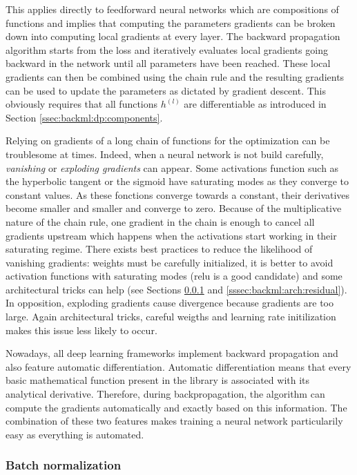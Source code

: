 This applies directly to feedforward neural networks which are compositions of
functions and implies that computing the parameters gradients can be broken down
into computing local gradients at every layer. The backward propagation algorithm
starts from the loss and iteratively evaluates local gradients going backward in
the network until all parameters have been reached. These local gradients can then
be combined using the chain rule and the resulting gradients can be used to update
the parameters as dictated by gradient descent. This obviously requires that all
functions $h^{(l)}$ are differentiable as introduced in Section
\ref{ssec:backml:dp:components}.

Relying on gradients of a long chain of functions for the optimization can be
troublesome at times. Indeed, when a neural network is not build carefully,
\textit{vanishing} or \textit{exploding gradients} can appear. Some activations
function such as the hyperbolic tangent or the sigmoid have saturating modes as
they converge to constant values. As these fonctions converge towards a constant,
their derivatives become smaller and smaller and converge to zero. Because of the
multiplicative nature of the chain rule, one gradient in the chain is enough to
cancel all gradients upstream which happens when the activations start working in
their saturating regime. There exists best practices to reduce the likelihood of
vanishing gradients: weights must be carefully initialized, it is better to avoid
activation functions with saturating modes (\acrshort{relu} is a good candidate)
and some architectural tricks can help (see Sections \ref{sssec:backml:batchnorm}
and \ref{sssec:backml:arch:residual}). In opposition, exploding gradients cause
divergence because gradients are too large. Again architectural tricks, careful
weigths and learning rate initilization makes this issue less likely to occur.

Nowadays, all deep learning frameworks implement backward propagation and also
feature automatic differentiation. Automatic differentiation means that every
basic mathematical function present in the library is associated with its analytical
derivative. Therefore, during backpropagation, the algorithm can compute the
gradients automatically and exactly based on this information. The combination of
these two features makes training a neural network particularily easy as everything
is automated.

\subsubsection{Batch normalization}
\label{sssec:backml:batchnorm}

